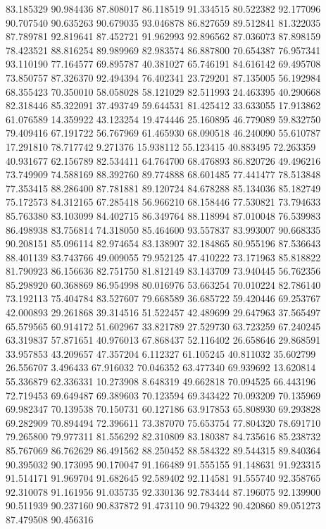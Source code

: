 83.185329
90.984436
87.808017
86.118519
91.334515
80.522382
92.177096
90.707540
90.635263
90.679035
93.046878
86.827659
89.512841
81.322035
87.789781
92.819641
87.452721
91.962993
92.896562
87.036073
87.898159
78.423521
88.816254
89.989969
82.983574
86.887800
70.654387
76.957341
93.110190
77.164577
69.895787
40.381027
65.746191
84.616142
69.495708
73.850757
87.326370
92.494394
76.402341
23.729201
87.135005
56.192984
68.355423
70.350010
58.058028
58.121029
82.511993
24.463395
40.290668
82.318446
85.322091
37.493749
59.644531
81.425412
33.633055
17.913862
61.076589
14.359922
43.123254
19.474446
25.160895
46.779089
59.832750
79.409416
67.191722
56.767969
61.465930
68.090518
46.240090
55.610787
17.291810
78.717742
9.271376
15.938112
55.123415
40.883495
72.263359
40.931677
62.156789
82.534411
64.764700
68.476893
86.820726
49.496216
73.749909
74.588169
88.392760
89.774888
68.601485
77.441477
78.513848
77.353415
88.286400
87.781881
89.120724
84.678288
85.134036
85.182749
75.172573
84.312165
67.285418
56.966210
68.158446
77.530821
73.794633
85.763380
83.103099
84.402715
86.349764
88.118994
87.010048
76.539983
86.498938
83.756814
74.318050
85.464600
93.557837
83.993007
90.668335
90.208151
85.096114
82.974654
83.138907
32.184865
80.955196
87.536643
88.401139
83.743766
49.009055
79.952125
47.410222
73.171963
85.818822
81.790923
86.156636
82.751750
81.812149
83.143709
73.940445
56.762356
85.298920
60.368869
86.954998
80.016976
53.663254
70.010224
82.786140
73.192113
75.404784
83.527607
79.668589
36.685722
59.420446
69.253767
42.000893
29.261868
39.314516
51.522457
42.489699
29.647963
37.565497
65.579565
60.914172
51.602967
33.821789
27.529730
63.723259
67.240245
63.319837
57.871651
40.976013
67.868437
52.116402
26.658646
29.868591
33.957853
43.209657
47.357204
6.112327
61.105245
40.811032
35.602799
26.556707
3.496433
67.916032
70.046352
63.477340
69.939692
13.620814
55.336879
62.336331
10.273908
8.648319
49.662818
70.094525
66.443196
72.719453
69.649487
69.389603
70.123594
69.343422
70.093209
70.135969
69.982347
70.139538
70.150731
60.127186
63.917853
65.808930
69.293828
69.282909
70.894494
72.396611
73.387070
75.653754
77.804320
78.691710
79.265800
79.977311
81.556292
82.310809
83.180387
84.735616
85.238732
85.767069
86.762629
86.491562
88.250452
88.584322
89.544315
89.840364
90.395032
90.173095
90.170047
91.166489
91.555155
91.148631
91.923315
91.514171
91.969704
91.682645
92.589402
92.114581
91.555740
92.358765
92.310078
91.161956
91.035735
92.330136
92.783444
87.196075
92.139900
90.511939
90.237160
90.837872
91.473110
90.794322
90.420860
89.051273
87.479508
90.456316
